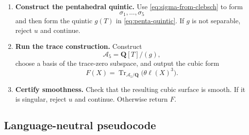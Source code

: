 \documentclass[11pt]{article}
\newcommand{\QQ}{\mathbf{Q}}
\newcommand{\Tr}{\operatorname{Tr}}
\newcommand{\cA}{\mathcal{A}}
\begin{document}
\begin{enumerate}[label=\textbf{Step \arabic*.}]
\item \textbf{Construct the pentahedral quintic.}
Use \eqref{eq:sigma-from-clebsch} to form
\[
  \sigma_1,\ldots,\sigma_5
\]
and then form the quintic $g(T)$ in \eqref{eq:penta-quintic}.  If $g$ is not
separable, reject $u$ and continue.

\item \textbf{Run the trace construction.}
Construct
\[
  \cA_5=\QQ[T]/(g),
\]
choose a basis of the trace-zero subspace, and output the cubic form
\[
  F(X)=\Tr_{\cA_5/\QQ}\bigl(\theta\ell(X)^3\bigr).
\]

\item \textbf{Certify smoothness.}
Check that the resulting cubic surface is smooth.  If it is singular, reject $u$
and continue.  Otherwise return $F$.
\end{enumerate}

\subsection{Language-neutral pseudocode}
\end{document}
